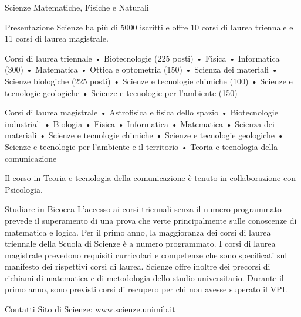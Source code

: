 Scienze Matematiche, Fisiche e Naturali

Presentazione
Scienze ha più di 5000 iscritti e offre 10 corsi di laurea triennale e 11 corsi di laurea magistrale.

Corsi di laurea triennale
     • Biotecnologie (225 posti) 
     • Fisica 
     • Informatica (300)
     • Matematica 
     • Ottica e optometria (150) 
     • Scienza dei materiali 
     • Scienze biologiche (225 posti) 
     • Scienze e tecnologie chimiche (100) 
     • Scienze e tecnologie geologiche 
     • Scienze e tecnologie per l'ambiente (150)

Corsi di laurea magistrale
     • Astrofisica e fisica dello spazio 
     • Biotecnologie industriali 
     • Biologia 
     • Fisica 
     • Informatica 
     • Matematica 
     • Scienza dei materiali 
     • Scienze e tecnologie chimiche 
     • Scienze e tecnologie geologiche 
     • Scienze e tecnologie per l'ambiente e il territorio 
     • Teoria e tecnologia della comunicazione 

Il corso in Teoria e tecnologia della comunicazione è tenuto in collaborazione con Psicologia. 

Studiare in Bicocca
L'accesso ai corsi triennali senza il numero programmato prevede il superamento di una prova che verte principalmente sulle conoscenze di matematica e logica. Per il primo anno, la maggioranza dei corsi di laurea triennale della Scuola di Scienze è a numero programmato. I corsi di laurea magistrale prevedono requisiti curricolari e competenze che sono specificati sul manifesto dei rispettivi corsi di laurea. 
Scienze offre inoltre dei precorsi di richiami di matematica e di metodologia dello studio universitario. Durante il primo anno, sono previsti corsi di recupero per chi non avesse superato il VPI. 

Contatti
Sito di Scienze: www.scienze.unimib.it 

